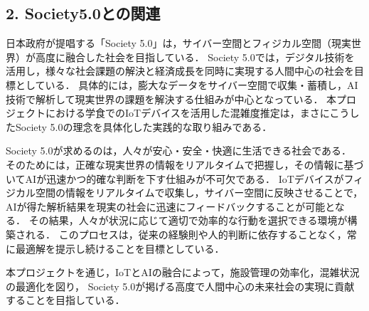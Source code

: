 \subsection*{2. Society5.0との関連}
日本政府が提唱する「Society 5.0」は，サイバー空間とフィジカル空間（現実世界）が高度に融合した社会を目指している．
Society 5.0では，デジタル技術を活用し，様々な社会課題の解決と経済成長を同時に実現する人間中心の社会を目標としている．
具体的には，膨大なデータをサイバー空間で収集・蓄積し，AI技術で解析して現実世界の課題を解決する仕組みが中心となっている．
本プロジェクトにおける学食でのIoTデバイスを活用した混雑度推定は，まさにこうしたSociety 5.0の理念を具体化した実践的な取り組みである．

Society 5.0が求めるのは，人々が安心・安全・快適に生活できる社会である．
そのためには，正確な現実世界の情報をリアルタイムで把握し，その情報に基づいてAIが迅速かつ的確な判断を下す仕組みが不可欠である．
IoTデバイスがフィジカル空間の情報をリアルタイムで収集し，サイバー空間に反映させることで，AIが得た解析結果を現実の社会に迅速にフィードバックすることが可能となる．
その結果，人々が状況に応じて適切で効率的な行動を選択できる環境が構築される．
このプロセスは，従来の経験則や人的判断に依存することなく，常に最適解を提示し続けることを目標としている．

本プロジェクトを通じ，IoTとAIの融合によって，施設管理の効率化，混雑状況の最適化を図り，
Society 5.0が掲げる高度で人間中心の未来社会の実現に貢献することを目指している．








%
%
